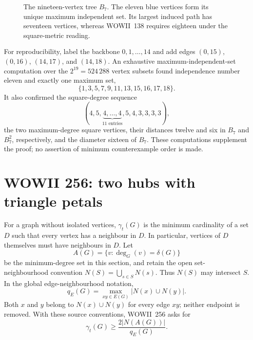 \documentclass[11pt,a4paper]{article}
\theoremstyle{remark}
\begin{document}
\begin{figure}[htbp]
\centering
{}
\caption{The nineteen-vertex tree $B_7$.  The eleven blue vertices form
its unique maximum independent set.  Its largest induced path has
seventeen vertices, whereas WOWII~138 requires eighteen under the
square-metric reading.}
\label{newce:fig:138}
\end{figure}

For reproducibility, label the backbone $0,1,\ldots,14$ and add edges
$(0,15)$, $(0,16)$, $(14,17)$, and $(14,18)$.  An exhaustive
maximum-independent-set computation over the $2^{19}=524\,288$ vertex
subsets found independence number eleven and exactly one maximum set,
\[
\{1,3,5,7,9,11,13,15,16,17,18\}.
\]
It also confirmed the square-degree sequence
\[
(4,5,\underbrace{4,\ldots,4}_{11\text{ entries}},5,4,3,3,3,3),
\]
the two maximum-degree square vertices, their distances twelve and six
in $B_7$ and $B_7^2$, respectively, and the diameter sixteen of $B_7$.
These computations supplement the proof; no assertion of minimum
counterexample order is made.

\section{WOWII 256: two hubs with triangle petals}
\label{sec:256}

For a graph without isolated vertices, $\gamma_t(G)$ is the minimum
cardinality of a set $D$ such that every vertex has a neighbour in $D$.
In particular, vertices of $D$ themselves must have neighbours in $D$.
Let
\[
A(G)=\{v:\deg_G(v)=\delta(G)\}
\]
be the minimum-degree set in this section, and retain the open
set-neighbourhood convention
$N(S)=\bigcup_{s\in S}N(s)$.
Thus $N(S)$ may intersect $S$.  In the global edge-neighbourhood
notation,
\[
q_E(G)=\max_{xy\in E(G)}|N(x)\cup N(y)|.
\]
Both $x$ and $y$ belong to $N(x)\cup N(y)$ for every edge $xy$;
neither endpoint is removed.  With these source conventions, WOWII~256
asks for
\begin{equation}\label{newce:eq:256-source}
\gamma_t(G)\ge\frac{2|N(A(G))|}{q_E(G)}.
\end{equation}
\end{document}
